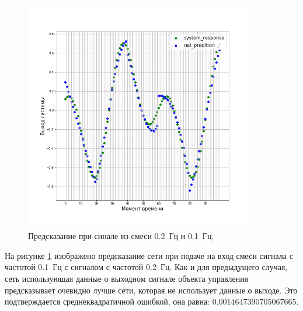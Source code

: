 \documentclass[12pt, oneside]{extbook}
\begin{document}
\begin{flushleft}
\begin{figure}[h]
\includegraphics[width=0.9\textwidth]{rnn_2_prediction_mix}
\caption{Предсказание при синале из смеси 0.2~Гц и 0.1~Гц.}
\label{fig:lstm_2_prediction_mix}
\end{figure}
На рисунке \ref{fig:lstm_2_prediction_mix} изображено предсказание сети при подаче на вход смеси сигнала с частотой 0.1~Гц с сигналом с частотой 0.2~Гц. Как и для предыдущего случая, сеть использующая данные о выходном сигнале объекта управления предсказывает очевидно лучше сети, которая не использует данные о выходе. Это подтверждается среднеквадратичной ошибкой, она равна: $ 0.0014647390705067665$.
\pagebreak
\par
\begin{figure}[!ht]
     \hfill
\end{figure}
\end{flushleft}
\end{document}
